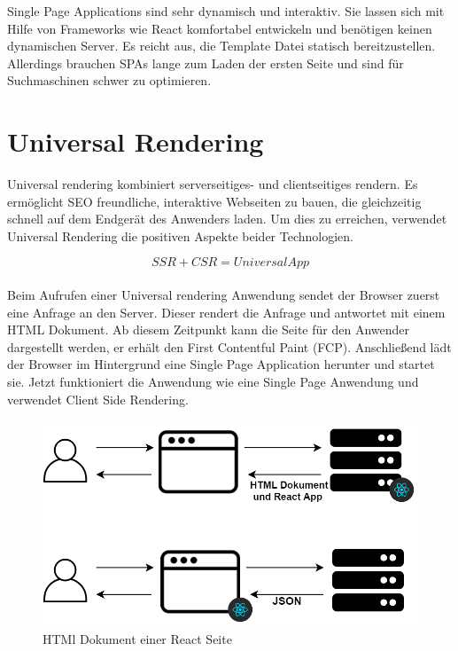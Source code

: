 \documentclass[runningheads]{llncs}
\begin{document}
Single Page Applications sind sehr dynamisch und interaktiv. 
Sie lassen sich mit Hilfe von Frameworks wie React komfortabel entwickeln
und benötigen keinen dynamischen Server. Es reicht aus, 
die Template Datei statisch bereitzustellen. 
Allerdings brauchen SPAs lange zum Laden der ersten Seite
und sind für Suchmaschinen schwer zu optimieren. 
\newpage

\section{Universal Rendering}
\label{sec:Universal Rendering}
Universal rendering kombiniert serverseitiges- und clientseitiges rendern. 
Es ermöglicht SEO freundliche, interaktive Webseiten zu bauen, 
die gleichzeitig schnell auf dem Endgerät des Anwenders laden. 
Um dies zu erreichen, 
verwendet Universal Rendering die positiven Aspekte beider Technologien.

\begin{equation*}
  SSR + CSR = Universal App
\end{equation*}
\\
Beim Aufrufen einer Universal rendering Anwendung sendet der Browser
zuerst eine Anfrage an den Server. 
Dieser rendert die Anfrage und antwortet mit einem HTML Dokument. 
Ab diesem Zeitpunkt kann die Seite für den Anwender dargestellt werden, 
er erhält den First Contentful Paint (FCP). 
Anschließend lädt der Browser im Hintergrund eine Single Page Application herunter
und startet sie. 
Jetzt funktioniert die Anwendung wie eine Single Page Anwendung und 
verwendet Client Side Rendering. 
\begin{figure}[h]
  \centering
  \includegraphics[width=12cm]{images/react}
  \caption{HTMl Dokument einer React Seite}
\end{figure}
\end{document}
